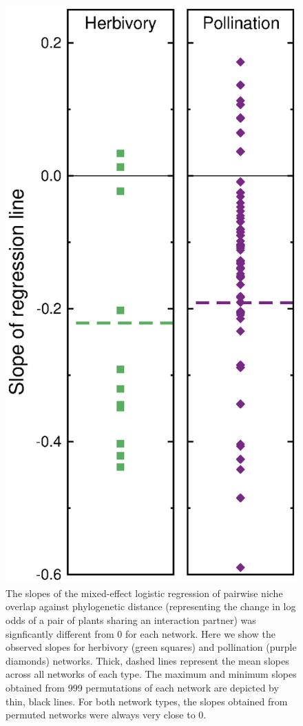 \documentclass[12pt]{article}
\begin{document}
  \begin{figure}[!h]
    \begin{center}
      \centerline{\includegraphics*[height=.75\textwidth]{Figures/dataplots/observed_vs_random.eps}}
    \end{center}
     \caption{The slopes of the mixed-effect logistic regression of pairwise niche overlap against phylogenetic distance (representing the change in log odds of a pair of plants sharing an interaction partner) was signficantly different from 0 for each network. Here we show the observed slopes for herbivory (green squares) and pollination (purple diamonds) networks. Thick, dashed lines represent the mean slopes across all networks of each type. The maximum and minimum slopes obtained from 999 permutations of each network are depicted by thin, black lines. For both network types, the slopes obtained from permuted networks were always very close to 0.}
    \label{obs_vs_random} 
  \end{figure}
\end{document}
